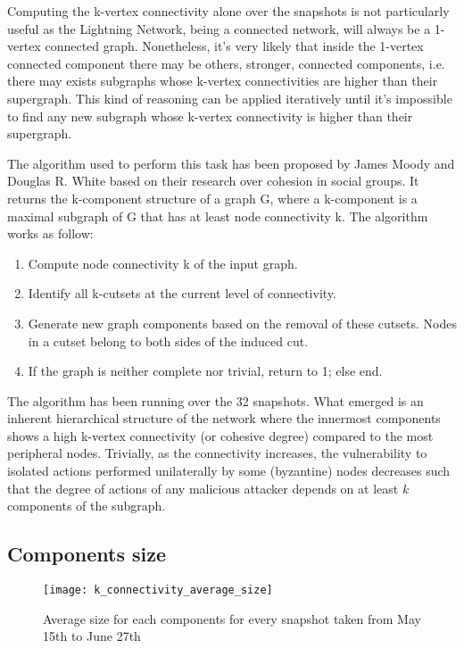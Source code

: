 	Computing the k-vertex connectivity alone over the snapshots is not particularly useful as the Lightning Network, being a connected network, will always be a 1-vertex connected graph. Nonetheless, it's very likely that inside the 1-vertex connected component there may be others, stronger, connected components, i.e. there may exists subgraphs whose k-vertex connectivities are higher than their supergraph. This kind of reasoning can be applied iteratively until it's impossible to find any new subgraph whose k-vertex connectivity is higher than their supergraph.
	
	The algorithm used to perform this task has been proposed by James Moody and Douglas R. White \cite{Moody2003} based on their research over cohesion in social groups. It returns the k-component structure of a graph G, where a k-component is a maximal subgraph of G that has at least node connectivity k. The algorithm works as follow:
	\begin{enumerate}
		\item Compute node connectivity k of the input graph.
		\item Identify all k-cutsets at the current level of connectivity. 
		\item Generate new graph components based on the removal of these cutsets. Nodes in a cutset belong to both sides of the induced cut.
		\item If the graph is neither complete nor trivial, return to 1; else end.
	\end{enumerate}
	
	The algorithm has been running over the 32 snapshots. What emerged is an inherent hierarchical structure of the network where the innermost components shows a high k-vertex connectivity (or cohesive degree) compared to the most peripheral nodes. Trivially, as the connectivity increases, the vulnerability to isolated actions performed unilaterally by some (byzantine) nodes decreases such that the degree of actions of any malicious attacker depends on at least $k$ components of the subgraph.
	
	\subsection{Components size}
	
	\begin{figure}
		\texttt{[image: k\_connectivity\_average\_size]}\\
		\caption{Average size for each components for every snapshot taken from May 15th to June 27th}
		\label{monthly_connectivity_average}
	\end{figure}
	
